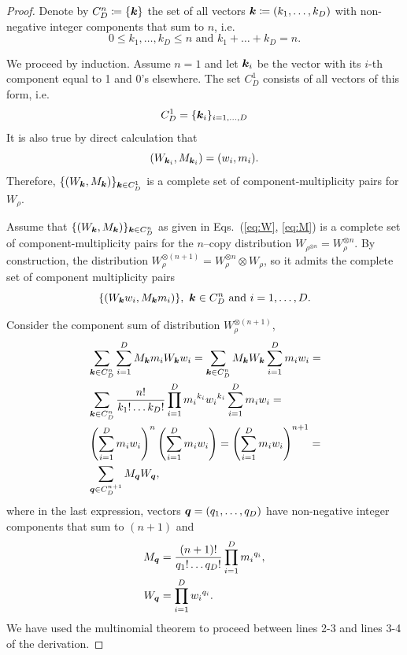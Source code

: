 \documentclass[pra,
aps,
twocolumn,
superscriptaddress,
groupedaddress,
nofootinbib,
reprint
]{revtex4-1}
\begin{document}
\begin{proof}
	Denote by $C_D^n \coloneqq \{\bm{k}\}$ the set of all vectors $\bm{k} \coloneqq (k_1, \dots, k_D)$ with non-negative integer components that sum to $n$, i.e.
	\begin{equation*}
	0 \leq k_1, \dots, k_D \leq n \text{ and } k_1 + \dots + k_D = n.
	\end{equation*}
	
	We proceed by induction.	
	Assume $n = 1$ and let $\bm{k}_i$ be the vector with its $i$-th component equal to 1 and 0's elsewhere.
	The set $C_D^1$ consists of all vectors of this form, i.e. 
\begin{equation*}
	C_D^1 = \{ \bm{k}_i \}_{i=1,\dots,D}
\end{equation*}
	It is also true by direct calculation that
\begin{equation*}
	\left( W_{\bm{k}_i}, M_{\bm{k}_i} \right) = (w_i, m_i).
\end{equation*}
Therefore, $\{ (W_{\bm{k}}, M_{\bm{k}}) \}_{\bm{k} \in C_D^1}$ is a complete set of component-multiplicity pairs for $W_\rho$.

	Assume that $\{(W_{\bm{k}}, M_{\bm{k}})\}_{\bm{k} \in C_D^n}$ as given in Eqs.~(\ref{eq:W}, \ref{eq:M}) is a complete set of component-multiplicity pairs for the $n$--copy distribution $W_{\rho^{\otimes n}} = W_{\rho}^{\otimes n}$.
	By construction, the distribution $W_{\rho}^{\otimes (n+1)} = W_{\rho}^{\otimes n} \otimes W_{\rho}$, so it admits the complete set of component multiplicity pairs
\begin{equation}
	\{(W_{\bm{k}} w_i, M_{\bm{k}} m_i)\},\ \bm{k} \in C_D^n \text{ and } i=1,\dots,D.
\end{equation}
	
	Consider the component sum of distribution $W_{\rho}^{\otimes (n+1)}$,
\begin{align*}
	&\sum_{\bm{k} \in C_D^n}\sum_{i=1}^D M_{\bm{k}} m_i W_{\bm{k}} w_i = \sum_{\bm{k} \in C_D^n} M_{\bm{k}}W_{\bm{k}} \sum_{i=1}^D m_i w_i =\\
	&\sum_{\bm{k} \in C_D^n} \frac{n!}{k_1!\dots k_D!} \prod\limits_{i=1}^D {m_i}^{k_i}{w_i}^{k_i} \sum_{i=1}^D m_i w_i =\\
	&\left( \sum_{i=1}^D m_i w_i \right)^n \left( \sum_{i=1}^D m_i w_i \right) = \left( \sum_{i=1}^D m_i w_i \right)^{n+1} =\\
	&\sum_{\bm{q} \in C_D^{n+1}} M_{\bm{q}}W_{\bm{q}},
\end{align*}
where in the last expression, vectors $\bm{q} = (q_1, \dots, q_D)$ have non-negative integer components that sum to $(n+1)$ and 
\begin{align*}
	M_{\bm{q}} &= \frac{(n+1)!}{q_1!\dots q_D!} \prod\limits_{i=1}^D {m_i}^{q_i},\\
	W_{\bm{q}} &= \prod\limits_{i=1}^D {w_i}^{q_i}.
\end{align*}
We have used the multinomial theorem to proceed between lines 2-3 and lines 3-4 of the derivation.


\end{proof}
\end{document}

